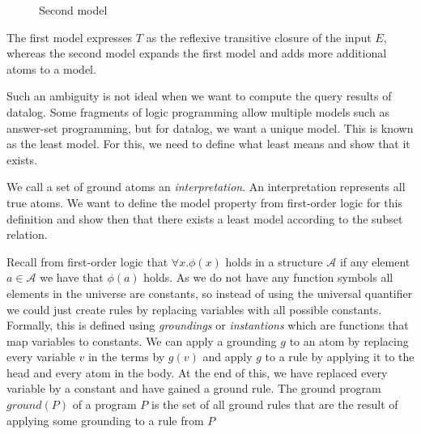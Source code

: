 \begin{contexample}
\begin{figure}
\begin{minipage}[b]{0.45\linewidth}
        \caption{Second model}
    \end{minipage}
    \end{figure}
    
    The first model expresses $T$ as the reflexive transitive closure of the input $E$, whereas the second model expands the first model and adds more additional atoms to a model.
\end{contexample}

Such an ambiguity is not ideal when we want to compute the query results of datalog. Some fragments of logic programming allow multiple models such as answer-set programming, but for datalog, we want a unique model. This is known as the least model. For this, we need to define what least means and show that it exists.

We call a set of ground atoms an \textit{interpretation}. An interpretation represents all true atoms. We want to define the model property from first-order logic for this definition and show then that there exists a least model according to the subset relation.

Recall from first-order logic that $\forall x. \phi(x)$ holds in a structure $\mathcal{A}$ if any element $a \in \mathcal{A}$ we have that $\phi(a)$ holds. As we do not have any function symbols all elements in the universe are constants, so instead of using the universal quantifier we could just create rules by replacing variables with all possible constants.
Formally, this is defined using \textit{groundings} or \textit{instantions} which are functions that map variables to constants. We can apply a grounding $g$ to an atom by replacing every variable $v$ in the terms by $g(v)$ and apply $g$ to a rule by applying it to the head and every atom in the body. At the end of this, we have replaced every variable by a constant and have gained a ground rule. 
The ground program $ground(P)$ of a program $P$ is the set of all ground rules that are the result of applying some grounding to a rule from $P$

